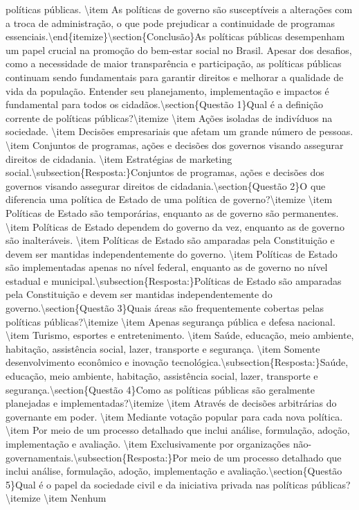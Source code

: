 \documentclass[
   article,       
   12pt,          
   oneside,       
   a4paper,       
   english,       
   brazil,        
   sumario=tradicional
   ]{abntex2}
\begin{document}
políticas públicas.    \textbackslash{}item As políticas de governo são susceptíveis a alterações com a troca de administração, o que pode prejudicar a continuidade de programas essenciais.\textbackslash{}end\{itemize\}\textbackslash{}section\{Conclusão\}As políticas públicas desempenham um papel crucial na promoção do bem-estar social no Brasil. Apesar dos desafios, como a necessidade de maior transparência e participação, as políticas públicas continuam sendo fundamentais para garantir direitos e melhorar a qualidade de vida da população. Entender seu planejamento, implementação e impactos é fundamental para todos os cidadãos.\textbackslash{}section\{Questão 1\}Qual é a definição corrente de políticas públicas?\textbackslash{}itemize    \textbackslash{}item Ações isoladas de indivíduos na sociedade.    \textbackslash{}item Decisões empresariais que afetam um grande número de pessoas.    \textbackslash{}item Conjuntos de programas, ações e decisões dos governos visando assegurar direitos de cidadania.    \textbackslash{}item Estratégias de marketing social.\textbackslash{}subsection\{Resposta:\}Conjuntos de programas, ações e decisões dos governos visando assegurar direitos de cidadania.\textbackslash{}section\{Questão 2\}O que diferencia uma política de Estado de uma política de governo?\textbackslash{}itemize    \textbackslash{}item Políticas de Estado são temporárias, enquanto as de governo são permanentes.    \textbackslash{}item Políticas de Estado dependem do governo da vez, enquanto as de governo são inalteráveis.    \textbackslash{}item Políticas de Estado são amparadas pela Constituição e devem ser mantidas independentemente do governo.    \textbackslash{}item Políticas de Estado são implementadas apenas no nível federal, enquanto as de governo no nível estadual e municipal.\textbackslash{}subsection\{Resposta:\}Políticas de Estado são amparadas pela Constituição e devem ser mantidas independentemente do governo.\textbackslash{}section\{Questão 3\}Quais áreas são frequentemente cobertas pelas políticas públicas?\textbackslash{}itemize    \textbackslash{}item Apenas segurança pública e defesa nacional.    \textbackslash{}item Turismo, esportes e entretenimento.    \textbackslash{}item Saúde, educação, meio ambiente, habitação, assistência social, lazer, transporte e segurança.    \textbackslash{}item Somente desenvolvimento econômico e inovação tecnológica.\textbackslash{}subsection\{Resposta:\}Saúde, educação, meio ambiente, habitação, assistência social, lazer, transporte e segurança.\textbackslash{}section\{Questão 4\}Como as políticas públicas são geralmente planejadas e implementadas?\textbackslash{}itemize    \textbackslash{}item Através de decisões arbitrárias do governante em poder.    \textbackslash{}item Mediante votação popular para cada nova política.    \textbackslash{}item Por meio de um processo detalhado que inclui análise, formulação, adoção, implementação e avaliação.    \textbackslash{}item Exclusivamente por organizações não-governamentais.\textbackslash{}subsection\{Resposta:\}Por meio de um processo detalhado que inclui análise, formulação, adoção, implementação e avaliação.\textbackslash{}section\{Questão 5\}Qual é o papel da sociedade civil e da iniciativa privada nas políticas públicas?\textbackslash{}itemize    \textbackslash{}item Nenhum 
\end{document}

